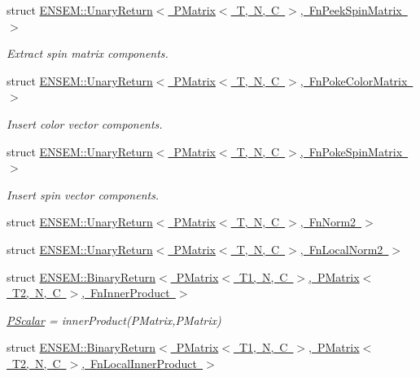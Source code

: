 \begin{DoxyCompactItemize}
struct \mbox{\hyperlink{structENSEM_1_1UnaryReturn_3_01PMatrix_3_01T_00_01N_00_01C_01_4_00_01FnPeekSpinMatrix_01_4}{E\+N\+S\+E\+M\+::\+Unary\+Return$<$ P\+Matrix$<$ T, N, C $>$, Fn\+Peek\+Spin\+Matrix $>$}}
\begin{DoxyCompactList}\small\item\em Extract spin matrix components. \end{DoxyCompactList}\item 
struct \mbox{\hyperlink{structENSEM_1_1UnaryReturn_3_01PMatrix_3_01T_00_01N_00_01C_01_4_00_01FnPokeColorMatrix_01_4}{E\+N\+S\+E\+M\+::\+Unary\+Return$<$ P\+Matrix$<$ T, N, C $>$, Fn\+Poke\+Color\+Matrix $>$}}
\begin{DoxyCompactList}\small\item\em Insert color vector components. \end{DoxyCompactList}\item 
struct \mbox{\hyperlink{structENSEM_1_1UnaryReturn_3_01PMatrix_3_01T_00_01N_00_01C_01_4_00_01FnPokeSpinMatrix_01_4}{E\+N\+S\+E\+M\+::\+Unary\+Return$<$ P\+Matrix$<$ T, N, C $>$, Fn\+Poke\+Spin\+Matrix $>$}}
\begin{DoxyCompactList}\small\item\em Insert spin vector components. \end{DoxyCompactList}\item 
struct \mbox{\hyperlink{structENSEM_1_1UnaryReturn_3_01PMatrix_3_01T_00_01N_00_01C_01_4_00_01FnNorm2_01_4}{E\+N\+S\+E\+M\+::\+Unary\+Return$<$ P\+Matrix$<$ T, N, C $>$, Fn\+Norm2 $>$}}
\item 
struct \mbox{\hyperlink{structENSEM_1_1UnaryReturn_3_01PMatrix_3_01T_00_01N_00_01C_01_4_00_01FnLocalNorm2_01_4}{E\+N\+S\+E\+M\+::\+Unary\+Return$<$ P\+Matrix$<$ T, N, C $>$, Fn\+Local\+Norm2 $>$}}
\item 
struct \mbox{\hyperlink{structENSEM_1_1BinaryReturn_3_01PMatrix_3_01T1_00_01N_00_01C_01_4_00_01PMatrix_3_01T2_00_01N_00_073dfb745dc2b12345e8e4de199894c8}{E\+N\+S\+E\+M\+::\+Binary\+Return$<$ P\+Matrix$<$ T1, N, C $>$, P\+Matrix$<$ T2, N, C $>$, Fn\+Inner\+Product $>$}}
\begin{DoxyCompactList}\small\item\em \mbox{\hyperlink{classENSEM_1_1PScalar}{P\+Scalar}} = inner\+Product(\+P\+Matrix,\+P\+Matrix) \end{DoxyCompactList}\item 
struct \mbox{\hyperlink{structENSEM_1_1BinaryReturn_3_01PMatrix_3_01T1_00_01N_00_01C_01_4_00_01PMatrix_3_01T2_00_01N_00_21d827057038aa42c2c8bc00c90c1d07}{E\+N\+S\+E\+M\+::\+Binary\+Return$<$ P\+Matrix$<$ T1, N, C $>$, P\+Matrix$<$ T2, N, C $>$, Fn\+Local\+Inner\+Product $>$}}

\end{DoxyCompactItemize}
